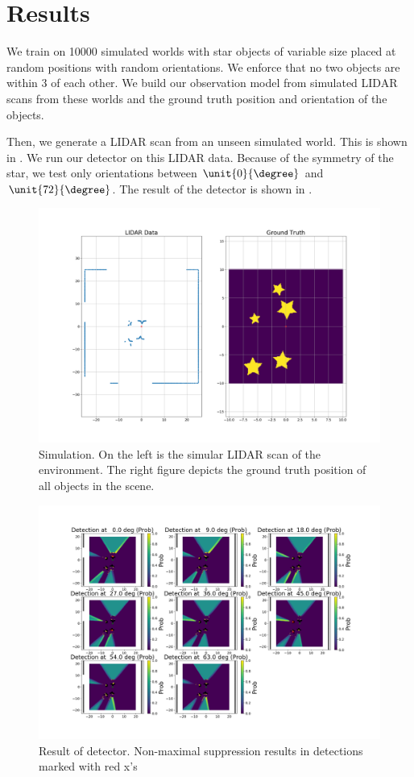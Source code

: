 \section{Results}

We train on 10000 simulated worlds with star objects of variable size placed at
random positions with random orientations. We enforce that no two objects are
within \unit{3}{\m} of each other. We build our observation model from simulated
LIDAR scans from these worlds and the ground truth position and orientation of
the objects.

Then, we generate a LIDAR scan from an unseen simulated world. This is shown in
. We run our detector on this LIDAR data. Because of the
symmetry of the star, we test only orientations between $\unit{0}{\degree}$ and
$\unit{72}{\degree}$. The result of the detector is shown in
.
%
\begin{figure}
  \centering
  \includegraphics[width=\columnwidth]{figures/ground_truth.png}
  \caption{Simulation. On the left is the simular LIDAR scan of the environment.
    The right figure depicts the ground truth position of all objects in the
    scene.}
  \label{fig:sim_world}
\end{figure}
%
\begin{figure}
  \centering
  \includegraphics[width=\textwidth]{figures/detections.png}
  \caption{Result of detector. Non-maximal suppression results in detections
    marked with red x's}
  \label{fig:detector}
\end{figure}


